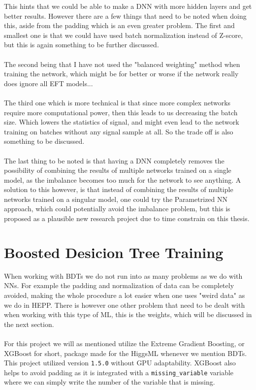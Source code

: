 \documentclass[14pt, a4paper]{book}
\begin{document}
\newpage\noindent This hints that we could be able to make a DNN with more hidden layers and get better results. However there are a few things that need to be noted when doing this, aside from the padding which is an even greater problem.
The first and smallest one is that we could have used batch normalization instead of Z-score, but this is again something to be further discussed.\\
\\The second being that I have not used the "balanced weighting" method when training the network, which might be for better or worse if the network really does ignore all EFT models...\\
\\The third one which is more technical is that since more complex networks require more computational power, then this leads to us decreasing the batch size. Which lowers the statistics of signal, 
and might even lead to the network training on batches without any signal sample at all. So the trade off is also something to be discussed.\\
\\The last thing to be noted is that having a DNN completely removes the possibility of combining the results of multiple networks trained on a single model, as the imbalance becomes too much for the network to see anything.
A solution to this however, is that instead of combining the results of multiple networks trained on a singular model, one could try the Parametrized NN approach, which could potentially avoid the imbalance problem, but this is 
proposed as a plausible new research project due to time constrain on this thesis.
\clearpage
\graphicspath{{../../figures/}}






\section{Boosted Desicion Tree Training}
When working with BDTs we do not run into as many problems as we do with NNs. For example the padding and normalization of data can be completely avoided, making the whole procedure a lot easier when one uses "weird data" as we do in HEPP.
There is however one other problem that need to be dealt with when working with this type of ML, this is the weights, which will be discussed in the next section.\\
\\For this project we will as mentioned  utilize the Extreme Gradient Boosting, or XGBoost for short, package made for the HiggsML whenever we mention BDTs.
This project utilized version \verb|1.5.0| without GPU adaptability. XGBoost also helps to avoid padding as it is integrated with a \verb|missing_variable| variable where we can simply write the number of the variable that is missing.
\end{document}
